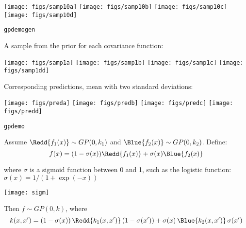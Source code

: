 \vspace*{-1.5ex}
\texttt{[image: figs/samp10a]} \hspace*{\negs}
\texttt{[image: figs/samp10b]} \hspace*{\negs}
\texttt{[image: figs/samp10c]} \hspace*{\negs}
\texttt{[image: figs/samp10d]}

\vspace*{-1ex}
{\tt gpdemogen}



A sample from the prior for each covariance function:

\texttt{[image: figs/samp1a]} \hspace*{\negs}
\texttt{[image: figs/samp1b]} \hspace*{\negs}
\texttt{[image: figs/samp1c]} \hspace*{\negs}
\texttt{[image: figs/samp1dd]}

\vspace{1ex}

Corresponding predictions, mean with two standard deviations:

\texttt{[image: figs/preda]} \hspace*{\negs}
\texttt{[image: figs/predb]} \hspace*{\negs}
\texttt{[image: figs/predc]} \hspace*{\negs}
\texttt{[image: figs/predd]}

\vspace*{-1ex}
{\tt gpdemo}


Assume $\Redd{f_1(x)} \sim GP(0,k_1)$ and $\Blue{f_2(x)} \sim GP(0,k_2)$. Define:
\[
f(x) = (1-\sigma(x)) \Redd{f_1(x)} + \sigma(x) \Blue{f_2(x)}
\]

\parbox{0.6\textwidth}{where $\sigma$ is a sigmoid function between 0 and 1, such as the
logistic function: $\sigma(x) = 1/(1+\exp(-x))$}
\parbox{0.4\textwidth}{\centerline{\texttt{[image: sigm]}}}

Then $f \sim GP(0,k)$, where
\[
k(x,x') = (1-\sigma(x)) \, \Redd{k_1(x,x')}  \, (1-\sigma(x')) + \sigma(x) \,
\Blue{k_2(x,x')} \, \sigma(x') 
\]

